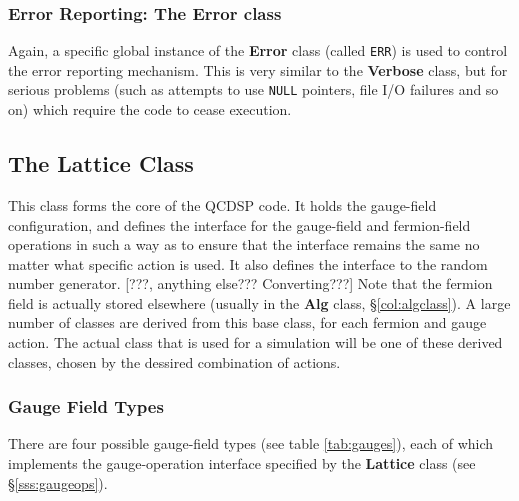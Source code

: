 \documentclass[12pt]{article}
\newcommand{\cls}[1]{{\bf #1}}            %
\newcommand{\cde}[1]{{\tt #1}}            %
\begin{document}
\subsubsection{Error Reporting: The Error class}
\label{col:errorclass}
Again, a specific global instance of the \cls{Error} class (called
\cde{ERR}) is used to control the error reporting mechanism.  This is
very similar to the \cls{Verbose} class, but for serious problems
(such as attempts to use \cde{NULL} pointers, file I/O failures and so
on) which require the code to cease execution.

\subsection{The Lattice Class}
\label{col:latticeclass}
This class forms the core of the QCDSP code.  It holds the gauge-field
configuration, and defines the interface for the gauge-field and
fermion-field operations in such a way as to ensure that the interface
remains the same no matter what specific action is used.  It also
defines the interface to the random number generator. [???, anything
else??? Converting???]
Note that the fermion field is actually stored elsewhere (usually in
the \cls{Alg} class, \S\ref{col:algclass}). A large number of classes
are derived from this base class, for each fermion and gauge action.
The actual class that is used for a simulation will be one of these
derived classes, chosen by the dessired combination of actions.

\subsubsection{Gauge Field Types}
There are four possible gauge-field types (see table
\ref{tab:gauges}), each of which implements the gauge-operation
interface specified by the \cls{Lattice} class (see
\S\ref{sss:gaugeops}).
\end{document}
